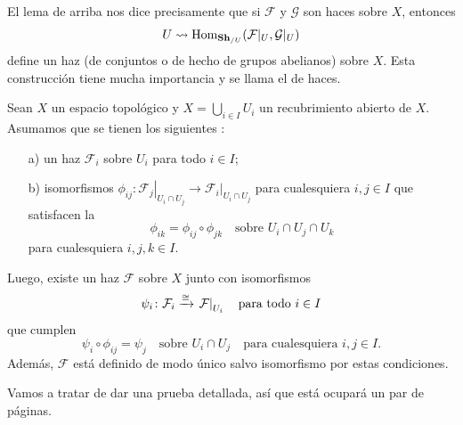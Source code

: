 \documentclass{article}
\numberwithin{equation}{section}
\theoremstyle{definition}
\begin{document}
\begin{comentario}
  El lema de arriba nos dice precisamente que si $\mathcal{F}$ y $\mathcal{G}$
  son haces sobre $X$, entonces
  $$U \rightsquigarrow \operatorname{Hom}_{\text{\bf Sh}_{/U}} (\mathcal{F}|_U, \mathcal{G}|_U)$$
  define un haz (de conjuntos o de hecho de grupos abelianos) sobre $X$.
  Esta construcción tiene mucha importancia y se llama el 
  de haces.
\end{comentario}

\begin{teorema}
  \label{thm:pegamiento-de-haces}
  Sean $X$ un espacio topológico y $X = \bigcup_{i\in I} U_i$ un recubrimiento
  abierto de $X$. Asumamos que se tienen los siguientes
  :
  \begin{enumerate}
  \item[a)] un haz $\mathcal{F}_i$ sobre $U_i$ para todo $i \in I$;

  \item[b)] isomorfismos
    $\phi_{ij}\colon \left.\mathcal{F}_j\right|_{U_i\cap U_j} \to \left.\mathcal{F}_i\right|_{U_i\cap U_j}$
    para cualesquiera $i,j \in I$ que satisfacen la 
    $$\phi_{ik} = \phi_{ij} \circ \phi_{jk} \quad\text{sobre }U_i \cap U_j \cap U_k$$
    para cualesquiera $i,j,k \in I$.
  \end{enumerate}

  Luego, existe un haz $\mathcal{F}$ sobre $X$ junto con isomorfismos
  \[ \psi_i\colon \mathcal{F}_i \xrightarrow{\cong} \left.\mathcal{F}\right|_{U_i}
     \quad\text{para todo }i \in I \]
  que cumplen
  \[ \psi_i \circ \phi_{ij} = \psi_j \quad\text{sobre }U_i \cap U_j
     \quad\text{para cualesquiera }i,j \in I. \]
  Además, $\mathcal{F}$ está definido de modo único salvo isomorfismo por estas
  condiciones.
\end{teorema}

Vamos a tratar de dar una prueba detallada, así que está ocupará un par
de páginas.
\end{document}
